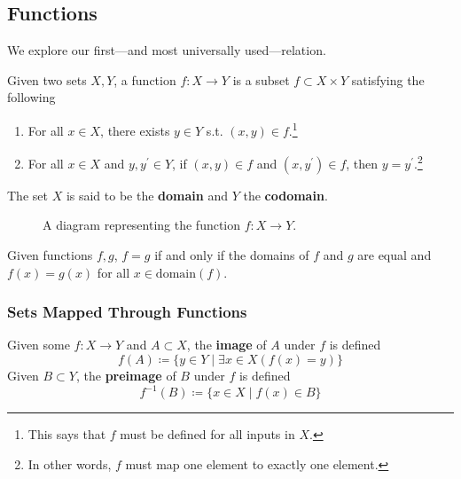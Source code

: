 \subsection{Functions} 

  We explore our first---and most universally used---relation. 

  \begin{definition}[Function]
    Given two sets $X, Y$, a function $f: X \rightarrow Y$ is a subset $f \subset X \times Y$ satisfying the following
    \begin{enumerate}
      \item For all $x \in X$, there exists $y \in Y$ s.t. $(x, y) \in f$.\footnote{This says that $f$ must be defined for all inputs in $X$.}
      \item For all $x \in X$ and $y, y^\prime \in Y$, if $(x, y) \in f$ and $(x, y^\prime) \in f$, then $y = y^\prime$.\footnote{In other words, $f$ must map one element to exactly one element.} 
    \end{enumerate}
    The set $X$ is said to be the \textbf{domain} and $Y$ the \textbf{codomain}. 

    \begin{figure}[H]
      \centering 
      \caption{A diagram representing the function $f: X \rightarrow Y$.} 
      \label{fig:function at}
    \end{figure}
  \end{definition} 

  \begin{lemma} 
    Given functions $f, g$, $f = g$ if and only if the domains of $f$ and $g$ are equal and $f(x) = g(x)$ for all $x \in \mathrm{domain}(f)$. 
  \end{lemma} 

\subsubsection{Sets Mapped Through Functions}

  \begin{definition}
    Given some $f: X \rightarrow Y$ and $A \subset X$, the \textbf{image} of $A$ under $f$ is defined 
    \begin{equation}
      f(A) \coloneqq \{y \in Y \mid \exists x \in X (f(x) = y)\}
    \end{equation}
    Given $B \subset Y$, the \textbf{preimage} of $B$ under $f$ is defined 
    \begin{equation}
      f^{-1} (B) \coloneqq \{ x \in X \mid f(x) \in B \}
    \end{equation}
  \end{definition} 


